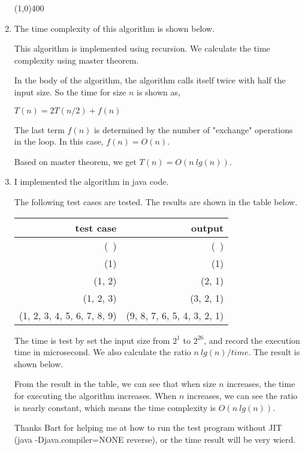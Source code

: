 \documentclass[11pt,letterpaper,oneside]{article}
\begin{document}
\begin{enumerate}
\vspace{-1em}\line(1,0){400}

\item The time complexity of this algorithm is shown below.
  
This algorithm is implemented using recursion. We calculate the time complexity using master theorem.

In the body of the algorithm, the algorithm calls itself twice with half the input size. So the time for size $n$ is shown as,

$T(n) = 2T(n/2) + f(n)$

The last term $f(n)$ is determined by the number of "exchange" operations in the loop. In this case, $f(n) = O(n)$.

Based on master theorem, we get $T(n) = O(n\ lg(n))$.

\item I implemented the algorithm in java code.

The following test cases are tested. The results are shown in the table below.

\begin{tabular}{rr}
test case & output \\ \hline
(\ ) & (\ ) \\
(1) & (1) \\
(1, 2) & (2, 1) \\
(1, 2, 3) & (3, 2, 1) \\
(1, 2, 3, 4, 5, 6, 7, 8, 9) & (9, 8, 7, 6, 5, 4, 3, 2, 1)
\end{tabular}

\null
\null

The time is test by set the input size from $2^1$ to $2^{26}$, and record the execution time in microsecond. We also calculate the ratio $n\ lg(n)/time$. The result is shown below.

From the result in the table, we can see that when size $n$ increases, the time for executing the algorithm increases. When $n$ increases, we can see the ratio is nearly constant, which means the time complexity is $O(n\ lg(n))$.

Thanks Bart for helping me at how to run the test program without JIT (java -Djava.compiler=NONE reverse), or the time result will be very wierd.


\end{enumerate}
\end{document}
